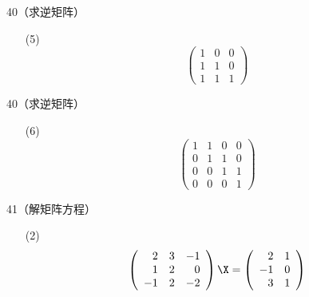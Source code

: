 \begin{frame}
  \begin{footnotesize}
    \begin{exampleblock}{40（求逆矩阵）}
      \begin{itemize}
      \item[(5)]
        $$
        \left(
        \begin{array}{rrr}
          1&0&0\\
          1&1&0\\
          1&1&1
        \end{array}
        \right)
        $$
      \end{itemize}
    \end{exampleblock}
  \end{footnotesize}
\end{frame}

\begin{frame}
  \begin{footnotesize}
    \begin{exampleblock}{40（求逆矩阵）}
      \begin{itemize}
      \item[(6)]
        $$
        \left(
        \begin{array}{rrrr}
          1&1&0&0\\
          0&1&1&0\\
          0&0&1&1\\
          0&0&0&1
        \end{array}
        \right)
        $$
      \end{itemize}
    \end{exampleblock}
  \end{footnotesize}
\end{frame}


\begin{frame}
  \begin{footnotesize}
    \begin{exampleblock}{41（解矩阵方程）}
      \begin{itemize}
      \item[(2)]
        $$
        \left(
        \begin{array}{rrr}
          2&3&-1\\
          1&2&0\\
          -1&2&-2
        \end{array}
        \right)\X=
        \left(
        \begin{array}{rr}
          2&1\\
          -1&0\\
          3&1
        \end{array}
        \right)        
        $$
      \end{itemize}
    \end{exampleblock}
  \end{footnotesize}
\end{frame}

